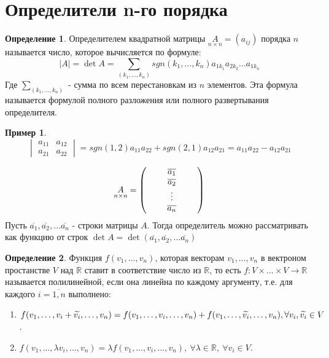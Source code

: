 \documentclass[a4paper, 12pt]{article}
\newcommand{\R}{\mathbb R}
\newcommand\tab[1][.5cm]{\hspace*{#1}}
\theoremstyle{definition}
\newtheorem*{definition}{Определение}
\newtheorem*{example1}{Пример}
\begin{document}
  \section{Определители n-го порядка}
  \begin{definition}
    Определителем квадратной матрицы $\underset{n \times n}{A}=(a_{ij})$ порядка $n$ называется число, которое вычисляется по формуле:
    $$|A|=\det{A}=\sum\limits_{(k_1,\dots,k_n)}sgn(k_1,\dots,k_n)a_{1k_1}a_{2k_2}\dots a_{1k_n}$$
    Где $\sum\limits_{(k_1,\dots,k_n)}$ - сумма по всем перестановкам из $n$ элементов. Эта формула называется формулой полного разложения или полного развертывания определителя.
  \end{definition}
  \begin{example1}
    $$\begin{vmatrix}
      a_{11} & a_{12}\\
      a_{21} & a_{22}  
    \end{vmatrix} = sgn(1,2)a_{11}a_{22}+sgn(2,1)a_{12}a_{21}=a_{11}a_{22}-a_{12}a_{21}$$
  \end{example1}
  $$\underset{n \times n}{A}=\begin{pmatrix}
    \tab & \overline{a_1} & \tab\\
    \null & \overline{a_2} & \null\\
    \null & \vdots & \null\\
    \null & \overline{a_n} & \null
  \end{pmatrix}$$
  Пусть $\overline{a_1}, \overline{a_2}, \dots \overline{a_n}$ - строки матрицы $A$. Тогда определитель можно рассматривать как функцию от строк $\det{A}=\det{(\overline{a_1},\overline{a_2},\dots \overline{a_n})}$
  \begin{definition}
    Функция $f(v_1,\dots, v_n)$, которая векторам $v_1,\dots, v_n$ в вектроном простанстве $V$ над $\R$ ставит в соответствие число из $\R$, то есть $f:V\times\dots\times V\to \R$
    называется полилинейной, если она линейна по каждому аргументу, т.е. для каждого $i=\overline{1,n}$ выполнено:
    \begin{enumerate}
      \item $f(v_1,\dots, v_i+\widetilde{v_i},\dots, v_n)=f(v_1,\dots, v_i,\dots, v_n)+f(v_1,\dots, \widetilde{v_i},\dots, v_n),\\ \forall v_i, \widetilde{v_i}\in V$.
      \item $f(v_1,\dots, \lambda v_i,\dots, v_n)=\lambda f(v_1,\dots, v_i,\dots, v_n),\ \forall \lambda\in \R,\ \forall v_i\in V$.
    \end{enumerate}
  \end{definition}
\end{document}
